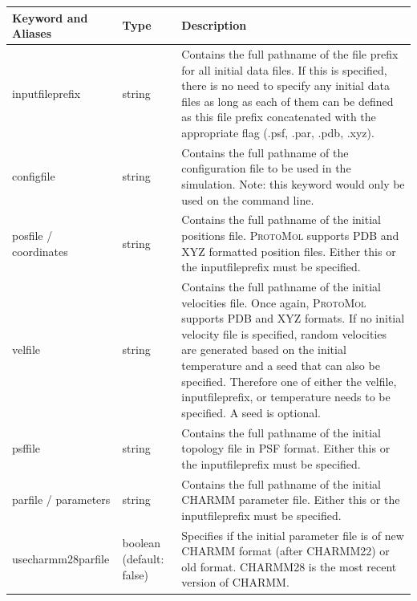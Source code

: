 \documentclass[11pt]{report}
\newcommand{\ProtoMol}{\textsc{ProtoMol }}
\begin{document}
\small
  \begin{tabular}{|p{5.5cm}|p{4cm}|p{6cm}|}\hline
    Keyword and Aliases & Type & Description   \\\hline\hline


    inputfileprefix &
    string &
    Contains the full pathname of the file prefix for all initial data files.  If this is specified, there is no need to specify any initial data files as long as each of them can be defined as this file prefix concatenated with the appropriate flag (.psf, .par, .pdb, .xyz). \\\hline

    configfile &
    string &
    Contains the full pathname of the configuration file to be used in the simulation.  Note: this keyword would only be used on the command line. \\\hline\hline


    posfile / coordinates &
    string &
    Contains the full pathname of the initial positions file.  \ProtoMol supports PDB and XYZ formatted position files.  Either this or the inputfileprefix must be specified.  \\\hline

    velfile &
    string &
    Contains the full pathname of the initial velocities file.  Once again, \ProtoMol supports PDB and XYZ formats.  If no initial velocity file is specified, random velocities are generated based on the initial temperature and a seed that can also be specified. Therefore one of either the velfile, inputfileprefix, or temperature needs to be specified. A seed is optional.\\\hline

    psffile &
    string &
    Contains the full pathname of the initial topology file in PSF format.  Either this or the inputfileprefix must be specified. \\\hline

    parfile / parameters &
    string &
    Contains the full pathname of the initial CHARMM parameter file.  Either this or the inputfileprefix must be specified. \\\hline


    usecharmm28parfile &
    boolean (default: false) &
    Specifies if the initial parameter file is of new CHARMM format (after CHARMM22) or old format.  CHARMM28 is the most recent version of CHARMM. \\\hline\hline


\end{tabular}
\end{document}
